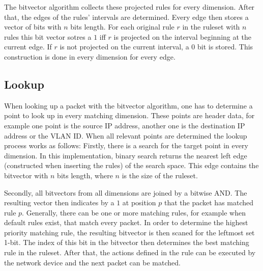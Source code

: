 \documentclass[a4paper,
		12pt,
		parskip=full,
		titlepage
		]{scrartcl}
\begin{document}
The bitvector algorithm collects these projected rules for every dimension.
After that, the edges of the rules' intervals are determined.
Every edge then stores a vector of bits with $n$ bits length.
For each original rule $r$ in the ruleset with $n$ rules this bit vector sotres a $1$ iff $r$ is projected on the interval beginning at the current edge.
If $r$ is not projected on the current interval, a $0$ bit is stored.
This construction is done in every dimension for every edge.

\subsection{Lookup}
When looking up a packet with the bitvector algorithm, one has to determine a point to look up in every matching dimension.
These points are header data, for example one point is the source IP address, another one is the destination IP address or the VLAN ID.
When all relevant points are determined the lookup process works as follows:
Firstly, there is a search for the target point in every dimension.
In this implementation, binary search returns the nearest left edge (constructed when inserting the rules) of the search space.
This edge contains the bitvector with $n$ bits length, where $n$ is the size of the ruleset.

Secondly, all bitvectors from all dimensions are joined by a bitwise AND.
The resulting vector then indicates by a $1$ at position $p$ that the packet has matched rule $p$.
Generally, there can be one or more matching rules, for example when default rules exist, that match every packet.
In order to determine the highest priority matching rule, the resulting bitvector is then scaned for the leftmost set 1-bit.
The index of this bit in the bitvector then determines the best matching rule in the ruleset.
After that, the actions defined in the rule can be executed by the network device and the next packet can be matched.

\newpage
{}


\end{document}
